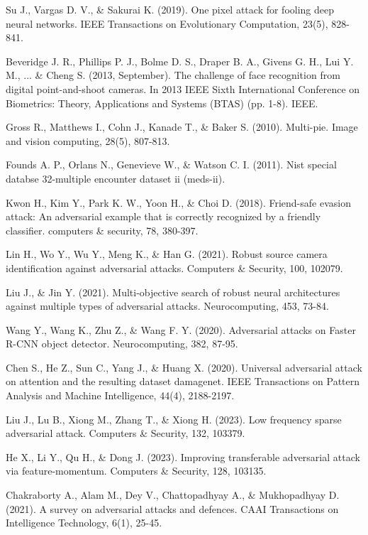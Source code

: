 \begin{thebibliography}{}
Su J., Vargas D. V., \& Sakurai K. (2019). One pixel attack for fooling deep neural networks. IEEE Transactions on Evolutionary Computation, 23(5), 828-841.

Beveridge J. R., Phillips P. J., Bolme D. S., Draper B. A., Givens G. H., Lui Y. M., ... \& Cheng S. (2013, September). The challenge of face recognition from digital point-and-shoot cameras. In 2013 IEEE Sixth International Conference on Biometrics: Theory, Applications and Systems (BTAS) (pp. 1-8). IEEE.

Gross R., Matthews I., Cohn J., Kanade T., \& Baker S. (2010). Multi-pie. Image and vision computing, 28(5), 807-813.

Founds A. P., Orlans N., Genevieve W., \& Watson C. I. (2011). Nist special databse 32-multiple encounter dataset ii (meds-ii).

Kwon H., Kim Y., Park K. W., Yoon H., \& Choi D. (2018). Friend-safe evasion attack: An adversarial example that is correctly recognized by a friendly classifier. computers \& security, 78, 380-397.

Lin H., Wo Y., Wu Y., Meng K., \& Han G. (2021). Robust source camera identification against adversarial attacks. Computers \& Security, 100, 102079.

Liu J., \& Jin Y. (2021). Multi-objective search of robust neural architectures against multiple types of adversarial attacks. Neurocomputing, 453, 73-84.

Wang Y., Wang K., Zhu Z., \& Wang F. Y. (2020). Adversarial attacks on Faster R-CNN object detector. Neurocomputing, 382, 87-95.

Chen S., He Z., Sun C., Yang J., \& Huang X. (2020). Universal adversarial attack on attention and the resulting dataset damagenet. IEEE Transactions on Pattern Analysis and Machine Intelligence, 44(4), 2188-2197.

Liu J., Lu B., Xiong M., Zhang T., \& Xiong H. (2023). Low frequency sparse adversarial attack. Computers \& Security, 132, 103379.

He X., Li Y., Qu H., \& Dong J. (2023). Improving transferable adversarial attack via feature-momentum. Computers \& Security, 128, 103135.

Chakraborty A., Alam M., Dey V., Chattopadhyay A., \& Mukhopadhyay D. (2021). A survey on adversarial attacks and defences. CAAI Transactions on Intelligence Technology, 6(1), 25-45.


\end{thebibliography}
